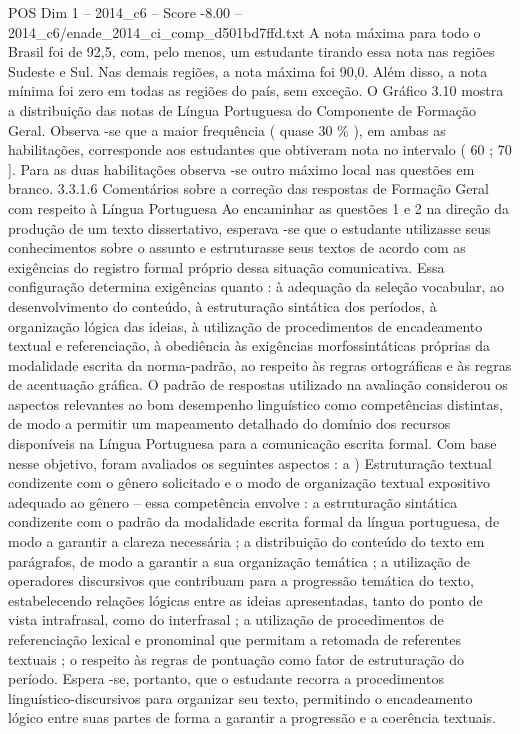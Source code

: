 \begin{textsample}{POS Dim 1 – 2014\_c6 – Score -8.00 – 2014\_c6/enade\_2014\_ci\_comp\_d501bd7ffd.txt}
A nota máxima para todo o Brasil foi de 92,5, com, pelo menos, um estudante tirando essa nota nas regiões Sudeste e Sul.
Nas demais regiões, a nota máxima foi 90,0.
Além disso, a nota mínima foi zero em todas as regiões do país, sem exceção.
O Gráfico 3.10 mostra a distribuição das notas de Língua Portuguesa do Componente de Formação Geral.
Observa -se que a maior frequência ( quase 30 \% ), em ambas as habilitações, corresponde aos estudantes que obtiveram nota no intervalo ( 60 ; 70 ].
Para as duas habilitações observa -se outro máximo local nas questões em branco. 3.3.1.6 Comentários sobre a correção das respostas de Formação Geral com respeito à Língua Portuguesa Ao encaminhar as questões 1 e 2 na direção da produção de um texto dissertativo, esperava -se que o estudante utilizasse seus conhecimentos sobre o assunto e estruturasse seus textos de acordo com as exigências do registro formal próprio dessa situação comunicativa.
Essa configuração determina exigências quanto : à adequação da seleção vocabular, ao desenvolvimento do conteúdo, à estruturação sintática dos períodos, à organização lógica das ideias, à utilização de procedimentos de encadeamento textual e referenciação, à obediência às exigências morfossintáticas próprias da modalidade escrita da norma-padrão, ao respeito às regras ortográficas e às regras de acentuação gráfica.
O padrão de respostas utilizado na avaliação considerou os aspectos relevantes ao bom desempenho linguístico como competências distintas, de modo a permitir um mapeamento detalhado do domínio dos recursos disponíveis na Língua Portuguesa para a comunicação escrita formal.
Com base nesse objetivo, foram avaliados os seguintes aspectos : a ) Estruturação textual condizente com o gênero solicitado e o modo de organização textual expositivo adequado ao gênero – essa competência envolve : a estruturação sintática condizente com o padrão da modalidade escrita formal da língua portuguesa, de modo a garantir a clareza necessária ; a distribuição do conteúdo do texto em parágrafos, de modo a garantir a sua organização temática ; a utilização de operadores discursivos que contribuam para a progressão temática do texto, estabelecendo relações lógicas entre as ideias apresentadas, tanto do ponto de vista intrafrasal, como do interfrasal ; a utilização de procedimentos de referenciação lexical e pronominal que permitam a retomada de referentes textuais ; o respeito às regras de pontuação como fator de estruturação do período.
Espera -se, portanto, que o estudante recorra a procedimentos linguístico-discursivos para organizar seu texto, permitindo o encadeamento lógico entre suas partes de forma a garantir a progressão e a coerência textuais.

\end{textsample}
